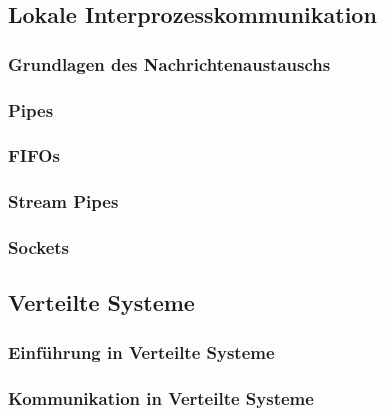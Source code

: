 \documentclass{article}
\begin{document}
\subsection{Lokale Interprozesskommunikation}
\subsubsection{Grundlagen des Nachrichtenaustauschs}
\subsubsection{Pipes}
\subsubsection{FIFOs}
\subsubsection{Stream Pipes}
\subsubsection{Sockets}
\subsection{Verteilte Systeme}
\subsubsection{Einführung in Verteilte Systeme}
\subsubsection{Kommunikation in Verteilte Systeme}
\end{document}
